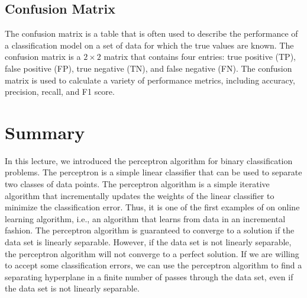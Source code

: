 \documentclass{article}[12pt]
\begin{document}
\subsection{Confusion Matrix}
The confusion matrix is a table that is often used to describe the performance of a classification model on a set of data for which the true values are known.
The confusion matrix is a $2\times{2}$ matrix that contains four entries: true positive (TP), false positive (FP), true negative (TN), and false negative (FN).
The confusion matrix is used to calculate a variety of performance metrics, including accuracy, precision, recall, and F1 score.


\section{Summary}
In this lecture, we introduced the perceptron algorithm for binary classification problems.
The perceptron is a simple linear classifier that can be used to separate two classes of data points.
The perceptron algorithm is a simple iterative algorithm that incrementally updates the weights of the linear classifier to minimize the classification error.
Thus, it is one of the first examples of on online learning algorithm, i.e., an algorithm that learns from data in an incremental fashion.
The perceptron algorithm is guaranteed to converge to a solution if the data set is linearly separable.
However, if the data set is not linearly separable, the perceptron algorithm will not converge to a perfect solution.
If we are willing to accept some classification errors, we can use the perceptron algorithm to find a separating hyperplane in a finite number of passes through the data set, 
even if the data set is not linearly separable.


\end{document}
